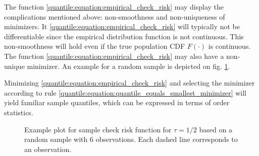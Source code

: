 The function \eqref{quantile:equation:empirical_check_risk} may display the complications mentioned above: non-smoothness and non-uniqueness of minimizers. 
%
It \eqref{quantile:equation:empirical_check_risk}  will typically not be differentiable since the empirical distribution function is not continuous. 
%
This non-smoothness will hold even if the true population CDF $F(\cdot)$ is continuous.
%
The function \eqref{quantile:equation:empirical_check_risk}   may also have a non-unique minimizer. An example for a random sample is depicted on fig. \ref{quantile:figure:sample_check_risk}.


 Minimizing \eqref{quantile:equation:empirical_check_risk}  and selecting the minimizer according to rule \ref{quantile:equation:quantile_equals_smallest_minimizer} will yield familiar sample quantiles, which can be expressed in terms of order statistics. 

\begin{figure}[ht!]
	\centering
	

\caption{Example plot for sample check risk function for $\tau=1/2$ based on a random sample with 6 observations. Each dashed line corresponds to an observation. } \label{quantile:figure:sample_check_risk}
\end{figure}
 
